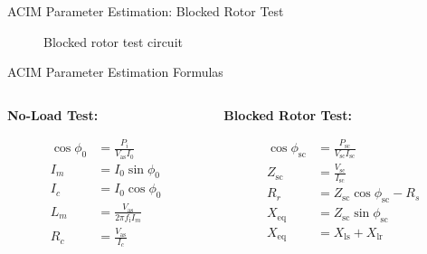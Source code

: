\begin{frame}{ACIM Parameter Estimation: Blocked Rotor Test}
	\begin{figure}
		\centering


		\caption{Blocked rotor test circuit}
	\end{figure}
\end{frame}



\begin{frame}{ACIM Parameter Estimation Formulas}
	\begin{columns}[T] %

		\begin{column}{0.48\textwidth} %

			\textbf{No-Load Test:}

			\begin{align*}
				\cos \phi_0 & = \frac{P_i}{V_\text{as}I_0}             \\
				I_m         & = I_0 \sin \phi_0                        \\
				I_c         & = I_0 \cos \phi_0                        \\
				L_m         & = \frac{V_\text{as}}{2\pi f_\text{i}I_m} \\
				R_c         & = \frac{V_\text{as}}{I_c}
			\end{align*}

		\end{column}

		\begin{column}{0.48\textwidth}

			\textbf{Blocked Rotor Test:}

			\begin{align*}
				\cos \phi_\text{sc} & = \frac{P_\text{sc}}{V_\text{sc}I_\text{sc}} \\
				Z_\text{sc}         & = \frac{V_\text{sc}}{I_\text{sc}}            \\
				R_r                 & = Z_\text{sc} \cos \phi_\text{sc} - R_s      \\
				X_\text{eq}         & = Z_\text{sc} \sin \phi_\text{sc}            \\
				X_\text{eq}         & = X_\text{ls} + X_\text{lr}
			\end{align*}

		\end{column}

	\end{columns}
\end{frame}


